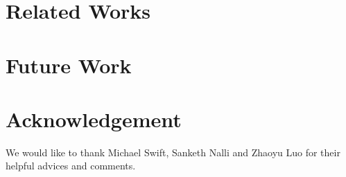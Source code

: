 \documentclass[letterpaper,11pt,twocolumn]{article}
\begin{document}

\section{Related Works}
\label{sec:related}
\section{Future Work}
\label{sec:future}

\section{Acknowledgement}
We would like to thank Michael Swift, Sanketh Nalli and Zhaoyu Luo for their helpful advices and comments. 



% 


\end{document}
